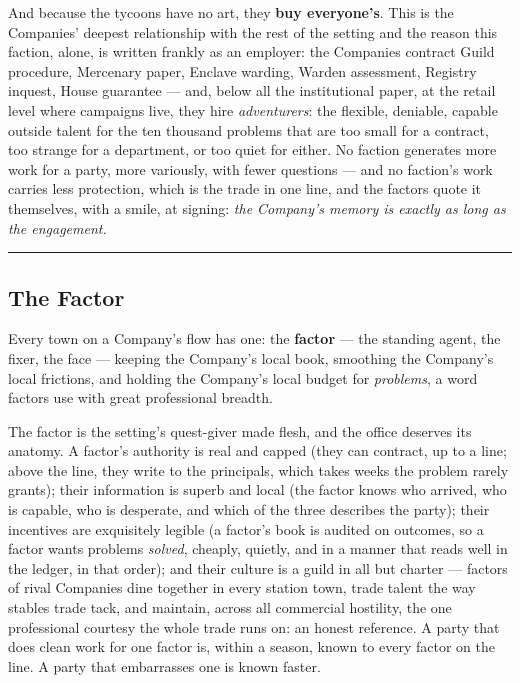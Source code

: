 And because the tycoons have no art, they \textbf{buy everyone's}. This is the Companies' deepest relationship with the rest of the setting and the reason this faction, alone, is written frankly as an employer: the Companies contract Guild procedure, Mercenary paper, Enclave warding, Warden assessment, Registry inquest, House guarantee --- and, below all the institutional paper, at the retail level where campaigns live, they hire \textit{adventurers}: the flexible, deniable, capable outside talent for the ten thousand problems that are too small for a contract, too strange for a department, or too quiet for either. No faction generates more work for a party, more variously, with fewer questions --- and no faction's work carries less protection, which is the trade in one line, and the factors quote it themselves, with a smile, at signing: \textit{the Company's memory is exactly as long as the engagement.}

\medskip\hrule\medskip

\subsection{The Factor}

Every town on a Company's flow has one: the \textbf{factor} --- the standing agent, the fixer, the face --- keeping the Company's local book, smoothing the Company's local frictions, and holding the Company's local budget for \textit{problems}, a word factors use with great professional breadth.

The factor is the setting's quest-giver made flesh, and the office deserves its anatomy. A factor's authority is real and capped (they can contract, up to a line; above the line, they write to the principals, which takes weeks the problem rarely grants); their information is superb and local (the factor knows who arrived, who is capable, who is desperate, and which of the three describes the party); their incentives are exquisitely legible (a factor's book is audited on outcomes, so a factor wants problems \textit{solved}, cheaply, quietly, and in a manner that reads well in the ledger, in that order); and their culture is a guild in all but charter --- factors of rival Companies dine together in every station town, trade talent the way stables trade tack, and maintain, across all commercial hostility, the one professional courtesy the whole trade runs on: an honest reference. A party that does clean work for one factor is, within a season, known to every factor on the line. A party that embarrasses one is known faster.

